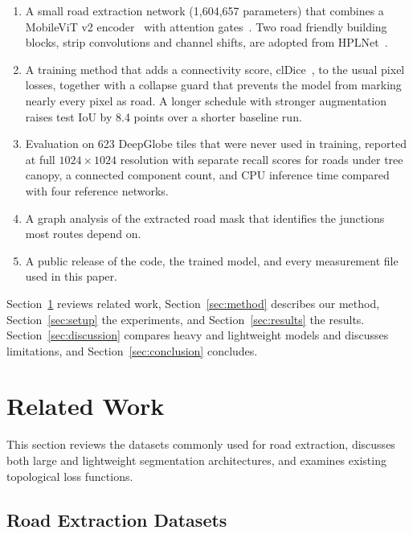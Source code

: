 \documentclass{ieeeaccess}
\begin{document}
\begin{enumerate}

\item A small road extraction network (1,604,657 parameters) that combines a MobileViT v2 encoder~\cite{mehta2023separable} with attention gates~\cite{oktay2018attention}. Two road friendly building blocks, strip convolutions and channel shifts, are adopted from HPLNet~\cite{cui2025hplnet}.

\item A training method that adds a connectivity score, clDice~\cite{shit2021cldice}, to the usual pixel losses, together with a collapse guard that prevents the model from marking nearly every pixel as road. A longer schedule with stronger augmentation raises test IoU by 8.4 points over a shorter baseline run.

\item Evaluation on 623 DeepGlobe tiles that were never used in training, reported at full $1024 \times 1024$ resolution with separate recall scores for roads under tree canopy, a connected component count, and CPU inference time compared with four reference networks.

\item A graph analysis of the extracted road mask that identifies the junctions most routes depend on.

\item A public release of the code, the trained model, and every measurement file used in this paper.

\end{enumerate}

Section~\ref{sec:related} reviews related work, Section~\ref{sec:method} describes our method, Section~\ref{sec:setup} the experiments, and Section~\ref{sec:results} the results. Section~\ref{sec:discussion} compares heavy and lightweight models and discusses limitations, and Section~\ref{sec:conclusion} concludes.

\section{Related Work}
\label{sec:related}

This section reviews the datasets commonly used for road extraction, discusses both large and lightweight segmentation architectures, and examines existing topological loss functions.

\subsection{Road Extraction Datasets}
\end{document}
